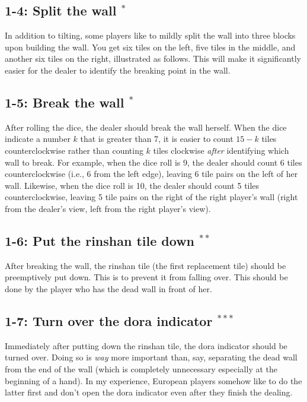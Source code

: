 \subsection*{1-4: Split the wall $^{*}$}
In addition to tilting, some players like to mildly split the wall into three blocks upon building the wall. You get six tiles on the left, five tiles in the middle, and another six tiles on the right, illustrated as follows. 
\bp
{}
\ep
This will make it significantly easier for the dealer to identify the breaking point in the wall. 

\subsection*{1-5: Break the wall $^{*}$}
After rolling the dice, the dealer should break the wall herself. When the dice indicate a number $k$ that is greater than 7, it is easier to count $15-k$ tiles counterclockwise rather than counting $k$ tiles clockwise \emph{after} identifying which wall to break. 
For example, when the dice roll is 9, the dealer should count 6 tiles counterclockwise (i.e., 6 from the left edge), leaving 6 tile pairs on the left of her wall. Likewise, when the dice roll is 10, the dealer should count 5 tiles counterclockwise, leaving 5 tile pairs on the right of the right player's wall (right from the dealer's view, left from the right player's view). 

\subsection*{1-6: Put the {\jap rinshan} tile down $^{**}$}
After breaking the wall, the {\jap rinshan} tile (the first replacement tile) should be preemptively put down. This is to prevent it from falling over. This should be done by the player who has the dead wall in front of her. 

\subsection*{1-7: Turn over the {\jap dora} indicator $^{***}$}
Immediately after putting down the {\jap rinshan} tile, the {\jap dora} indicator should be turned over. Doing so is \emph{way} more important than, say, separating the dead wall from the end of the wall (which is completely unnecessary especially at the beginning of a hand). In my experience, European players somehow like to do the latter first and don't open the {\jap dora} indicator even after they finish the dealing. 

